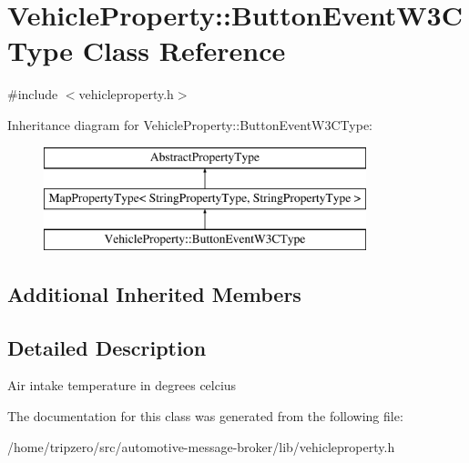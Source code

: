 \hypertarget{classVehicleProperty_1_1ButtonEventW3CType}{\section{Vehicle\-Property\-:\-:Button\-Event\-W3\-C\-Type Class Reference}
\label{classVehicleProperty_1_1ButtonEventW3CType}
}


{\ttfamily \#include $<$vehicleproperty.\-h$>$}

Inheritance diagram for Vehicle\-Property\-:\-:Button\-Event\-W3\-C\-Type\-:\begin{figure}[H]
\begin{center}
\leavevmode
\includegraphics[height=3.000000cm]{classVehicleProperty_1_1ButtonEventW3CType}
\end{center}
\end{figure}
\subsection*{Additional Inherited Members}


\subsection{Detailed Description}
Air intake temperature in degrees celcius 

The documentation for this class was generated from the following file\-:\begin{DoxyCompactItemize}
\item 
/home/tripzero/src/automotive-\/message-\/broker/lib/vehicleproperty.\-h\end{DoxyCompactItemize}
